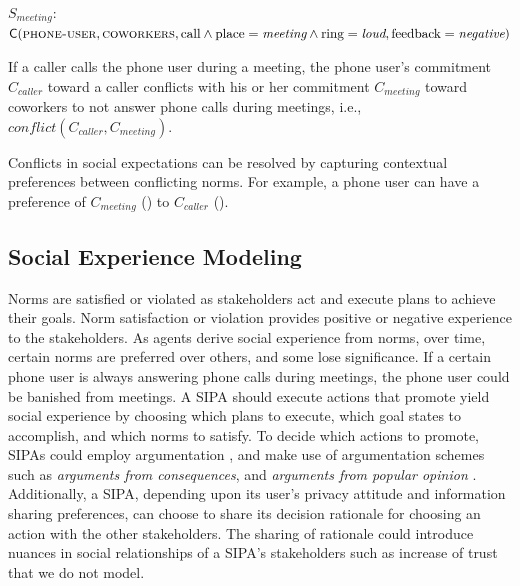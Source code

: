 \begin{description}[leftmargin=1em]
\begin{itemize}[leftmargin=1em]
    $S_{meeting}$: $\mathsf{C}(\textsc{phone-user},\textsc{coworkers}, \text{call} \\
    \land \text{place}=\textit{meeting} \land \text{ring}=\textit{loud}, \text{feedback}=\textit{negative})$
  \end{itemize}
  
  \item[Conflicts.] If a caller calls the phone user during a meeting, the phone 
  user's commitment $C_{caller}$ toward a caller conflicts with his or her 
  commitment $C_{meeting}$ toward coworkers to not answer phone calls 
  during meetings, i.e., \\$\mathit{conflict}(C_{caller}, C_{meeting})$.
    
\end{description}

Conflicts in social expectations can be resolved by capturing contextual 
preferences between conflicting norms. For example, a phone user can have a 
preference of  $C_{meeting}$ ()
to $C_{caller}$ (). 

\subsection{Social Experience Modeling}
Norms are satisfied or violated as stakeholders act and execute plans to
achieve their goals. Norm satisfaction or violation provides positive or
negative experience to the stakeholders. As agents derive social
experience from norms, over time, certain norms are preferred over
others, and some lose significance. If a certain phone user is always
answering phone calls during meetings, the phone user could be banished
from meetings. A SIPA should execute actions that promote yield social
experience by choosing which plans to execute, which goal states to
accomplish, and which norms to satisfy. To decide which actions to
promote, SIPAs could employ argumentation
\citep{BenchCapon-2007-Argumentation+AI}, and make use of argumentation
schemes such as \emph{arguments from consequences}, and \emph{arguments
from popular opinion} \citep{walton2008argumentation}. Additionally, a
SIPA, depending upon its user's privacy attitude and information sharing
preferences, can choose to share its decision rationale for choosing an
action with the other stakeholders. The sharing of rationale could
introduce nuances in social relationships of a SIPA's stakeholders such
as increase of trust that we do not model.



